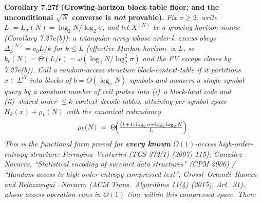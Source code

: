 \documentclass[
]{article}
\begin{document}
\textbf{Corollary 7.27f (Growing-horizon block-table floor; and the
unconditional $\sqrt N$ converse is \emph{not} provable).} \emph{Fix
$\sigma \geq 2$, write $L := L_\sigma(N) = \log_2 N/\log_2\sigma$, and let
$X^{(N)}$ be a growing-horizon source (Corollary 7.27e(b)): a triangular
array whose order-$k$ excess obeys $\Delta_k^{(N)} = c_0 L/k$ for $k \leq
L$ (effective Markov horizon $\propto L$, so $k_\epsilon(N) = \Theta(L/
\epsilon) = \omega(\log_2 N/\log_2^2\sigma)$ and the FV escape closes by
7.27e(b)). Call a random-access structure \emph{block-context-table} if it
partitions $x \in \Sigma^N$ into blocks of $b = O(\log_\sigma N)$ symbols
and answers a single-symbol query by a constant number of cell probes into
(i)~a block-local code and (ii)~shared order-$\leq k$ context-decode
tables, attaining per-symbol space $H_k(x) + \rho_k(N)$ with the
canonical redundancy}
\[
  \rho_k(N) \;=\; \Theta\!\Bigl(\tfrac{(k+1)\log_2\sigma + \log_2\log_2 N}
  {L}\Bigr) .
\]
\emph{This is the functional form proved for \textbf{every known}
$O(1)$-access high-order-entropy structure: Ferragina--Venturini (TCS
372(1) (2007) 115); Gonz\'alez--Navarro, ``Statistical encoding of
succinct data structures'' (CPM 2006) / ``Random access to high-order
entropy compressed text''; Grossi--Orlandi--Raman and Belazzougui
--Navarro (\emph{ACM Trans.\ Algorithms} 11(4) (2015), Art.\ 31), whose
access operation runs in $O(1)$ time within this compressed space. Then:}
\end{document}
